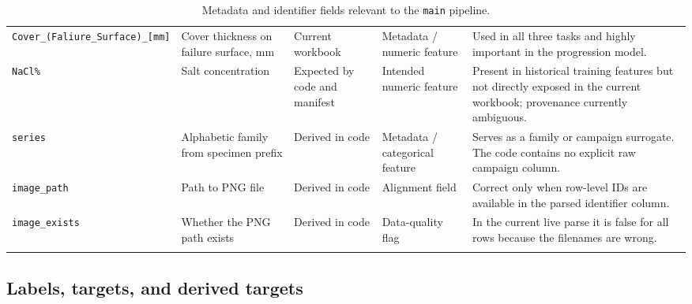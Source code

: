 \documentclass[11pt]{article}
\begin{document}
\begin{longtable}{p{} p{} p{} p{} p{}}
\texttt{Cover\_(Faliure\_Surface)\_[mm]} & Cover thickness on failure surface, mm & Current workbook & Metadata / numeric feature & Used in all three tasks and highly important in the progression model. \\
\texttt{NaCl\%} & Salt concentration & Expected by code and manifest & Intended numeric feature & Present in historical training features but not directly exposed in the current workbook; provenance currently ambiguous. \\
\texttt{series} & Alphabetic family from specimen prefix & Derived in code & Metadata / categorical feature & Serves as a family or campaign surrogate. The code contains no explicit raw campaign column. \\
\texttt{image\_path} & Path to PNG file & Derived in code & Alignment field & Correct only when row-level IDs are available in the parsed identifier column. \\
\texttt{image\_exists} & Whether the PNG path exists & Derived in code & Data-quality flag & In the current live parse it is false for all rows because the filenames are wrong. \\
\bottomrule
\caption{Metadata and identifier fields relevant to the \texttt{main} pipeline.}
\label{tab:metadata_dictionary}
\end{longtable}

\subsection{Labels, targets, and derived targets}
\end{document}
